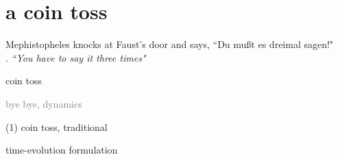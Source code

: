 \section[a coin toss]
 {a coin toss}

\begin{frame}{}
\begin{bartlett}{
Mephistopheles knocks at Faust's door and says, ``Du
mu{\ss}t es dreimal sagen!"
\\{\color{yellow}.}\qquad
{\scriptsize\emph{``You have to say it three times"}}
        }
\end{bartlett}
\vfill
\begin{enumerate}
              \item {\Large
coin toss
                  }\textcolor{gray}{\small
              \item
\templatt
              \item
\catlatt
              \item
bye bye, dynamics
                    }
            \end{enumerate}
\end{frame}

\renewcommand{\ssp}{\ensuremath{x}}               %

\begin{frame}{(1)  coin toss, traditional}
\vfill
    \begin{center}
{\huge time-evolution formulation}
    \end{center}
\vfill
\end{frame} %

